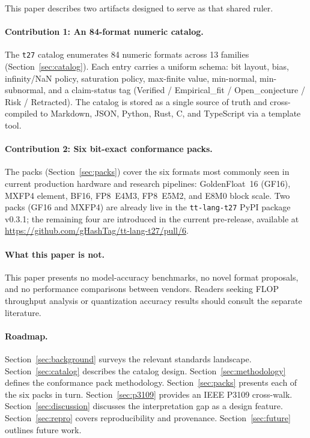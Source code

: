 \documentclass[11pt,letterpaper]{article}
\begin{document}
This paper describes two artifacts designed to serve as that shared ruler.

\paragraph{Contribution 1: An 84-format numeric catalog.}
The \texttt{t27} catalog enumerates 84 numeric formats across 13 families
(Section~\ref{sec:catalog}).  Each entry carries a uniform schema: bit layout,
bias, infinity/NaN policy, saturation policy, max-finite value, min-normal,
min-subnormal, and a claim-status tag (Verified / Empirical\_fit /
Open\_conjecture / Risk / Retracted).  The catalog is stored as a single source
of truth and cross-compiled to Markdown, JSON, Python, Rust, C, and TypeScript
via a template tool.

\paragraph{Contribution 2: Six bit-exact conformance packs.}
The packs (Section~\ref{sec:packs}) cover the six formats most commonly seen
in current production hardware and research pipelines: GoldenFloat~16 (GF16),
MXFP4 element, BF16, FP8~E4M3, FP8~E5M2, and E8M0 block scale.
Two packs (GF16 and MXFP4) are already live in the \texttt{tt-lang-t27}
PyPI package \mbox{v0.3.1}; the remaining four are introduced in the current
pre-release, available at
\url{https://github.com/gHashTag/tt-lang-t27/pull/6}.

\paragraph{What this paper is not.}
This paper presents no model-accuracy benchmarks, no novel format proposals, and
no performance comparisons between vendors.  Readers seeking FLOP throughput
analysis or quantization accuracy results should consult the separate literature.

\paragraph{Roadmap.}
Section~\ref{sec:background} surveys the relevant standards landscape.
Section~\ref{sec:catalog} describes the catalog design.
Section~\ref{sec:methodology} defines the conformance pack methodology.
Section~\ref{sec:packs} presents each of the six packs in turn.
Section~\ref{sec:p3109} provides an IEEE P3109 cross-walk.
Section~\ref{sec:discussion} discusses the interpretation gap as a design feature.
Section~\ref{sec:repro} covers reproducibility and provenance.
Section~\ref{sec:future} outlines future work.
\end{document}

